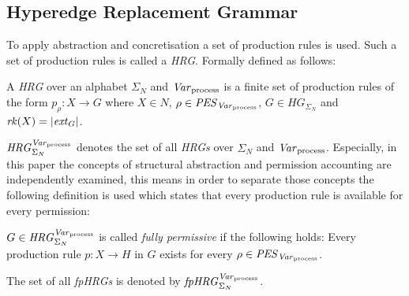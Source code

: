 	\subsection{Hyperedge Replacement Grammar}
	To apply abstraction and concretisation a set of production rules is used.
	Such a set of production rules is called a \emph{\ac{HRG}}. Formally defined
	as follows:
	\begin{definition}
		A \emph{\acl{HRG}} over an alphabet $\Sigma_N$ and
		$\mathit{Var}_{\text{process}}$ is a finite set of
		production rules of the form $p_{\rho}\colon X\rightarrow G$ where
		$X\in N$, $\rho\in\mathit{PES}_{\mathit{Var}_{\text{process}}}$,
		$G\in\mathit{HG}_{\Sigma_{N}}$ and $\mathit{rk}(X) = |\mathit{ext}_{G}|$.
	\end{definition}
	$\mathit{HRG}_{\Sigma_{N}}^{\mathit{Var}_{\text{process}}}$ denotes the set of all \emph{\acp{HRG}} over $\Sigma_{N}$ and
	$\mathit{Var}_{\text{process}}$. Especially, in this paper the concepts of structural abstraction and
	permission accounting are independently examined, this means in order to
	separate those concepts the following definition is used which states that
	every production rule is available for every permission:
	\begin{definition}
		\label{def:fpg}
		$G\in\mathit{HRG}_{\Sigma_{N}}^{\mathit{Var}_{\text{process}}}$ is called \emph{fully permissive} if the following holds:
		Every production rule $p\colon X\rightarrow H$ in $G$ exists for every
		$\rho\in\mathit{PES}_{\mathit{Var}_{\text{process}}}$.
	\end{definition}
	The set of all \emph{\acp{fpHRG}} is denoted by $\mathit{fpHRG}_{\Sigma_{N}}^{\mathit{Var}_{\text{process}}}$.

